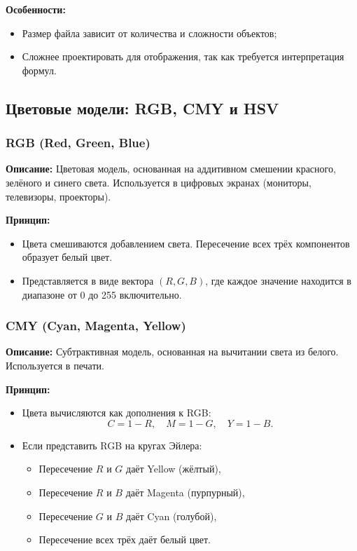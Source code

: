 \textbf{Особенности:}
\begin{itemize}
    \item Размер файла зависит от количества и сложности объектов;
    \item Сложнее проектировать для отображения, так как требуется интерпретация формул.
\end{itemize}

\subsection{Цветовые модели: RGB, CMY и HSV}

\subsubsection{RGB (Red, Green, Blue)}
\textbf{Описание:}
Цветовая модель, основанная на аддитивном смешении красного, зелёного и синего света. Используется в цифровых экранах (мониторы, телевизоры, проекторы).

\textbf{Принцип:}
\begin{itemize}
    \item Цвета смешиваются добавлением света. Пересечение всех трёх компонентов образует белый цвет.
    \item Представляется в виде вектора $(R, G, B)$, где каждое значение находится в диапазоне от 0 до 255 включительно.
\end{itemize}

\subsubsection{CMY (Cyan, Magenta, Yellow)}
\textbf{Описание:}
Субтрактивная модель, основанная на вычитании света из белого. Используется в печати.

\textbf{Принцип:}
\begin{itemize}
    \item Цвета вычисляются как дополнения к RGB:
          \[
              C = 1 - R, \quad M = 1 - G, \quad Y = 1 - B.
          \]
    \item Если представить RGB на кругах Эйлера:
          \begin{itemize}
              \item Пересечение $R$ и $G$ даёт Yellow (жёлтый),
              \item Пересечение $R$ и $B$ даёт Magenta (пурпурный),
              \item Пересечение $G$ и $B$ даёт Cyan (голубой),
              \item Пересечение всех трёх даёт белый цвет.
          \end{itemize}
\end{itemize}

